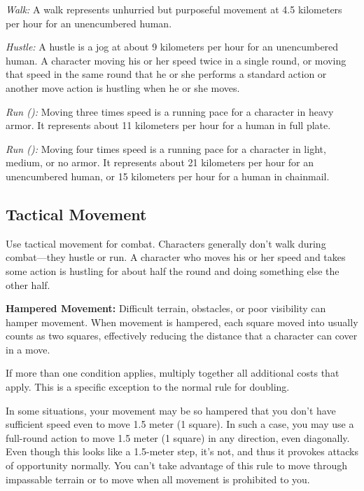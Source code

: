 \textit{Walk:} A walk represents unhurried but purposeful movement at 4.5 kilometers per hour for an unencumbered human.

\textit{Hustle:} A hustle is a jog at about 9 kilometers per hour for an unencumbered human. A character moving his or her speed twice in a single round, or moving that speed in the same round that he or she performs a standard action or another move action is hustling when he or she moves.

\textit{Run ():} Moving three times speed is a running pace for a character in heavy armor. It represents about 11 kilometers per hour for a human in full plate.

\textit{Run ():} Moving four times speed is a running pace for a character in light, medium, or no armor. It represents about 21 kilometers per hour for an unencumbered human, or 15 kilometers per hour for a human in chainmail.

\subsection{Tactical Movement}
Use tactical movement for combat. Characters generally don't walk during combat---they hustle or run. A character who moves his or her speed and takes some action is hustling for about half the round and doing something else the other half.


\textbf{Hampered Movement:} Difficult terrain, obstacles, or poor visibility can hamper movement. When movement is hampered, each square moved into usually counts as two squares, effectively reducing the distance that a character can cover in a move.

If more than one condition applies, multiply together all additional costs that apply. This is a specific exception to the normal rule for doubling.

In some situations, your movement may be so hampered that you don't have sufficient speed even to move 1.5 meter (1 square). In such a case, you may use a full-round action to move 1.5 meter (1 square) in any direction, even diagonally. Even though this looks like a 1.5-meter step, it's not, and thus it provokes attacks of opportunity normally. You can't take advantage of this rule to move through impassable terrain or to move when all movement is prohibited to you.

